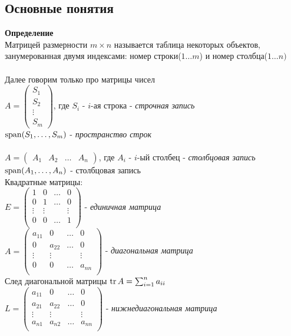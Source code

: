 \documentclass[12pt]{article}
\begin{document}
\subsection{Основные понятия}
\textbf{Определение}\\
Матрицей размерности $m\times n$ называется таблица некоторых объектов, занумерованная двумя индексами: номер строки($1\ldots m$) и номер столбца($1\ldots n)$\\\\
Далее говорим только про матрицы чисел\\
$A = \begin{pmatrix}
S_1\\
S_2\\
\vdots\\
S_m\end{pmatrix}$, где $S_i$ - $i$-ая строка - \textit{строчная запись}\\
$\operatorname{span}(S_1,\ldots,S_m)$ - \textit{пространство строк}\\\\
$A = \begin{pmatrix}A_1 & A_2 & \ldots & A_n\end{pmatrix}$, где $A_i$ - $i$-ый столбец - \textit{столбцовая запись}\\
$\operatorname{span}(A_1,\ldots, A_n)$ - столбцовая запись\\
Квадратные матрицы:\\
$E = \begin{pmatrix}
1 & 0 & \ldots & 0\\
0 & 1 & \ldots & 0\\
\vdots & \vdots &  & \vdots\\
0 & 0 & \ldots & 1\\\end{pmatrix}$ - \textit{единичная матрица}\\
$A = \begin{pmatrix}
a_{11} & 0 & \ldots & 0\\
0 & a_{22} & \ldots & 0\\
\vdots & \vdots &  & \vdots\\
0 & 0 & \ldots & a_{nn}\\\end{pmatrix}$ - \textit{диагональная матрица}\\
След диагональной матрицы $\operatorname{tr} A = \sum_{i=1}^n a_{ii}$\\
$L = \begin{pmatrix}
a_{11} & 0 & \ldots & 0\\
a_{21} & a_{22} & \ldots & 0\\
\vdots & \vdots &  & \vdots\\
a_{n1} & a_{n2} & \ldots & a_{nn}\\\end{pmatrix}$ - \textit{нижнедиагональная матрица}\\
\end{document}
